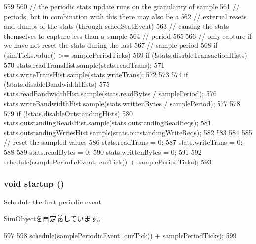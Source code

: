 \begin{DoxyCode}
559 {
560     // the periodic stats update runs on the granularity of sample
561     // periods, but in combination with this there may also be a
562     // external resets and dumps of the stats (through schedStatEvent)
563     // causing the stats themselves to capture less than a sample
564     // period
565 
566     // only capture if we have not reset the stats during the last
567     // sample period
568     if (simTicks.value() >= samplePeriodTicks) {
569         if (!stats.disableTransactionHists) {
570             stats.readTransHist.sample(stats.readTrans);
571             stats.writeTransHist.sample(stats.writeTrans);
572         }
573 
574         if (!stats.disableBandwidthHists) {
575             stats.readBandwidthHist.sample(stats.readBytes / samplePeriod);
576             stats.writeBandwidthHist.sample(stats.writtenBytes / samplePeriod);
577         }
578 
579         if (!stats.disableOutstandingHists) {
580             stats.outstandingReadsHist.sample(stats.outstandingReadReqs);
581             stats.outstandingWritesHist.sample(stats.outstandingWriteReqs);
582         }
583     }
584 
585     // reset the sampled values
586     stats.readTrans = 0;
587     stats.writeTrans = 0;
588 
589     stats.readBytes = 0;
590     stats.writtenBytes = 0;
591 
592     schedule(samplePeriodicEvent, curTick() + samplePeriodTicks);
593 }
\end{DoxyCode}
\hypertarget{classCommMonitor_aecc7d8debf54990ffeaaed5bac7d7d81}{
\subsubsection[{startup}]{\setlength{\rightskip}{0pt plus 5cm}void startup ()}}
\label{classCommMonitor_aecc7d8debf54990ffeaaed5bac7d7d81}
Schedule the first periodic event 

\hyperlink{classSimObject_aecc7d8debf54990ffeaaed5bac7d7d81}{SimObject}を再定義しています。


\begin{DoxyCode}
597 {
598     schedule(samplePeriodicEvent, curTick() + samplePeriodTicks);
599 }
\end{DoxyCode}


